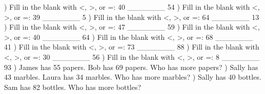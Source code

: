 \documentclass{article}%
\begin{document}
\newline%
) Fill in the blank with <, >, or =: 40 \_\_\_\_\_\_\_ 54%
\newline%
\newline%
) Fill in the blank with <, >, or =: 39 \_\_\_\_\_\_\_ 5%
\newline%
\newline%
) Fill in the blank with <, >, or =: 64 \_\_\_\_\_\_\_ 13%
\newline%
\newline%
) Fill in the blank with <, >, or =: 47 \_\_\_\_\_\_\_ 59%
\newline%
\newline%
) Fill in the blank with <, >, or =: 40 \_\_\_\_\_\_\_ 64%
\newline%
\newline%
) Fill in the blank with <, >, or =: 68 \_\_\_\_\_\_\_ 41%
\newline%
\newline%
) Fill in the blank with <, >, or =: 73 \_\_\_\_\_\_\_ 88%
\newline%
\newline%
) Fill in the blank with <, >, or =: 30 \_\_\_\_\_\_\_ 56%
\newline%
\newline%
) Fill in the blank with <, >, or =: 8 \_\_\_\_\_\_\_ 93%
\newline%
\newline%
) James has 55 papers. Bob has 69 papers. Who has more papers?%
\newline%
\newline%
) Sally has 43 marbles. Laura has 34 marbles. Who has more marbles?%
\newline%
\newline%
) Sally has 40 bottles. Sam has 82 bottles. Who has more bottles?%
\newline%
\newline%
\end{document}
